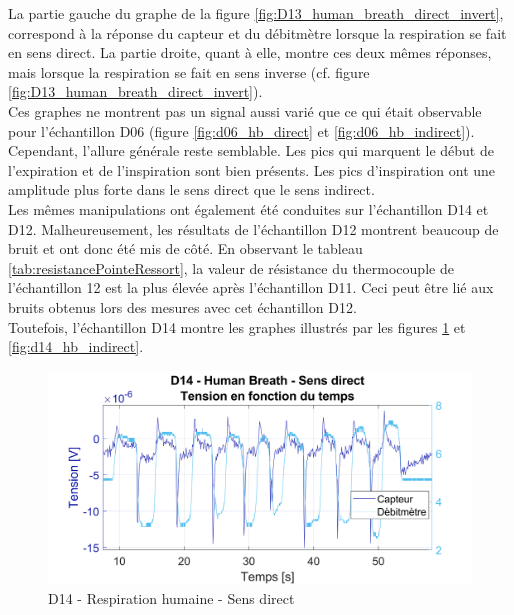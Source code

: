 La partie gauche du graphe de la figure \ref{fig:D13_human_breath_direct_invert}, correspond à la réponse du capteur et du débitmètre lorsque la 
respiration se fait en sens direct. La partie droite, quant à elle, montre ces deux mêmes réponses, mais lorsque la respiration se fait en sens 
inverse (cf. figure \ref{fig:D13_human_breath_direct_invert}). \\
Ces graphes ne montrent pas un signal aussi varié que ce qui était observable pour l'échantillon D06 (figure 
\ref{fig:d06_hb_direct} et \ref{fig:d06_hb_indirect}). Cependant, l'allure générale reste semblable. Les pics qui marquent le début de l'expiration 
et de l'inspiration sont bien présents. Les pics d'inspiration ont une amplitude plus forte dans le sens direct que le sens indirect. \\

Les mêmes manipulations ont également été conduites sur l'échantillon D14 et D12. Malheureusement, les résultats de l'échantillon D12 montrent 
beaucoup de bruit et ont donc été mis de côté. En observant le tableau \ref{tab:resistancePointeRessort}, la valeur de résistance du thermocouple 
de l'échantillon 12 est la plus élevée après l'échantillon D11. Ceci peut être lié aux bruits obtenus lors des mesures avec cet échantillon D12. \\

Toutefois, l'échantillon D14 montre les graphes illustrés par les figures \ref{fig:d14_hb_direct} et \ref{fig:d14_hb_indirect}. 


\begin{figure}[H]
    \centering
    \includegraphics[scale = 0.52]{assets/figures/D14_hb_sensDirect.svg}
    \caption{D14 - Respiration humaine - Sens direct}
    \label{fig:d14_hb_direct}
\end{figure}

